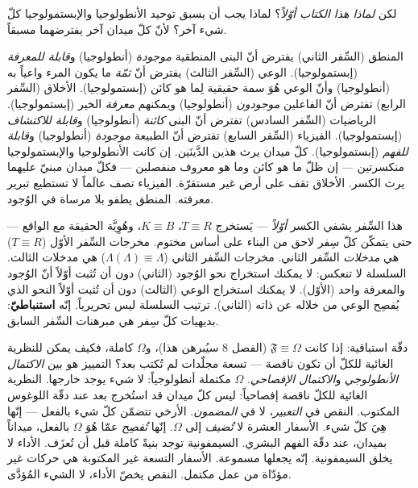 \documentclass[10pt, openany, oneside]{book}
\begin{document}
\noindent لكن \textit{لماذا هذا الكتاب أوّلاً}؟ لماذا يجب أن يسبق توحيد الأنطولوجيا والإبستمولوجيا كلّ شيء آخر؟ لأنّ كلّ ميدان آخر يفترضهما مسبقاً.

\vspace{0.3em}

\noindent المنطق (السِّفر الثاني) يفترض أنّ البنى المنطقية \textit{موجودة} (أنطولوجيا) و\textit{قابلة للمعرفة} (إبستمولوجيا). الوعي (السِّفر الثالث) يفترض أنّ \textit{ثمّة} ما يكون المرء واعياً به (أنطولوجيا) وأنّ الوعي هُوَ سمة حقيقية لِما هو كائن (إبستمولوجيا). الأخلاق (السِّفر الرابع) تفترض أنّ الفاعلين \textit{موجودون} (أنطولوجيا) ويمكنهم \textit{معرفة} الخير (إبستمولوجيا). الرياضيات (السِّفر السادس) تفترض أنّ البنى \textit{كائنة} (أنطولوجيا) و\textit{قابلة للاكتشاف} (إبستمولوجيا). الفيزياء (السِّفر السابع) تفترض أنّ الطبيعة \textit{موجودة} (أنطولوجيا) و\textit{قابلة للفهم} (إبستمولوجيا). كلّ ميدان يرث هذين الدَّينَين. إن كانت الأنطولوجيا والإبستمولوجيا منكسرتين --- إن ظلّ ما هو كائن وما هو معروف منفصلين --- فكلّ ميدان مبنيّ عليهما يرث الكسر. الأخلاق تقف على أرض غير مستقرّة. الفيزياء تصف عالَماً لا تستطيع تبرير معرفته. المنطق يطفو بلا مرساة في الوُجود.

\vspace{0.3em}

\noindent هذا السِّفر يشفي الكسر \textit{أوّلاً} --- يَستخرج $T \equiv R$، $K \equiv B$، وهُوِيَّة الحقيقة مع الواقع --- حتى يتمكّن كلّ سِفر لاحق من البناء على أساس مختوم. مخرجات السِّفر الأوّل ($T \equiv R$) هي \textit{مدخلات} السِّفر الثاني. مخرجات السِّفر الثاني ($\Lambda(\Lambda) \equiv \Lambda$) هي مدخلات الثالث. السلسلة لا تنعكس: لا يمكنك استخراج نحو الوُجود (الثاني) دون أن تُثبت أوّلاً أنّ الوُجود والمعرفة واحد (الأوّل). لا يمكنك استخراج الوعي (الثالث) دون أن تُثبت أوّلاً النحو الذي يُفصِح الوعي من خلاله عن ذاته (الثاني). ترتيب السلسلة ليس تحريرياً. إنّه \textbf{استنباطيّ}: بديهيات كلّ سِفر هي مبرهنات السِّفر السابق.

دقّة استباقية: إذا كانت $\mathfrak{F} \equiv \Omega$ (الفصل 8 سيُبرهن هذا)، و$\Omega$ كاملة، فكيف يمكن للنظرية الغائية للكلّ أن تكون ناقصة --- تسعة مجلّدات لم تُكتب بعد؟ التمييز هو بين \textit{الاكتمال الأنطولوجي} و\textit{الاكتمال الإفصاحي}. $\Omega$ مكتملة أنطولوجياً: لا شيء يوجد خارجها. النظرية الغائية للكلّ ناقصة إفصاحياً: ليس كلّ ميدان قد استُخرج بعد عند دقّة اللوغوس المكتوب. النقص في \textit{التعبير}، لا في \textit{المضمون}. الأرخي تتضمّن كلّ شيء بالفعل --- إنّها هِيَ كلّ شيء. الأسفار العشرة لا \textit{تُضيف} إلى $\Omega$. إنّها \textit{تُفصِح} عمّا هُوَ $\Omega$ بالفعل، ميداناً بميدان، عند دقّة الفهم البشري. السيمفونية توجد بنيةً كاملة قبل أن تُعزَف. الأداء لا يخلق السيمفونية. إنّه يجعلها مسموعة. الأسفار التسعة غير المكتوبة هي حركات غير مؤدّاة من عمل مكتمل. النقص يخصّ الأداء، لا الشيء المُؤدَّى.
\end{document}

